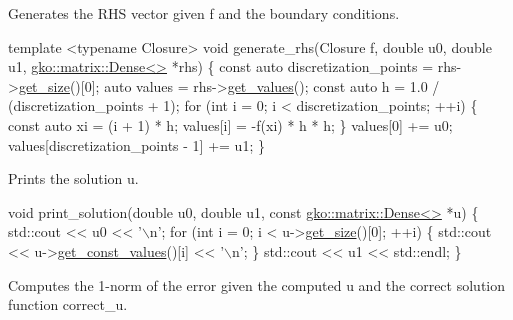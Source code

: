 Generates the R\+HS vector given {\ttfamily f} and the boundary conditions.


\begin{DoxyCode}
\textcolor{keyword}{template} <\textcolor{keyword}{typename} Closure>
\textcolor{keywordtype}{void} generate\_rhs(Closure f, \textcolor{keywordtype}{double} u0, \textcolor{keywordtype}{double} u1, \hyperlink{classgko_1_1matrix_1_1Dense}{gko::matrix::Dense<>} *rhs)
\{
    \textcolor{keyword}{const} \textcolor{keyword}{auto} discretization\_points = rhs->\hyperlink{classgko_1_1LinOp_a31b3c003388eb0b95393154f68c2b98d}{get\_size}()[0];
    \textcolor{keyword}{auto} values = rhs->\hyperlink{classgko_1_1matrix_1_1Dense_a3bc458e02fab8e4c9f60f70bd4d5a4f9}{get\_values}();
    \textcolor{keyword}{const} \textcolor{keyword}{auto} h = 1.0 / (discretization\_points + 1);
    \textcolor{keywordflow}{for} (\textcolor{keywordtype}{int} i = 0; i < discretization\_points; ++i) \{
        \textcolor{keyword}{const} \textcolor{keyword}{auto} xi = (i + 1) * h;
        values[i] = -f(xi) * h * h;
    \}
    values[0] += u0;
    values[discretization\_points - 1] += u1;
\}
\end{DoxyCode}


Prints the solution {\ttfamily u}.


\begin{DoxyCode}
\textcolor{keywordtype}{void} print\_solution(\textcolor{keywordtype}{double} u0, \textcolor{keywordtype}{double} u1, \textcolor{keyword}{const} \hyperlink{classgko_1_1matrix_1_1Dense}{gko::matrix::Dense<>} *u)
\{
    std::cout << u0 << \textcolor{charliteral}{'\(\backslash\)n'};
    \textcolor{keywordflow}{for} (\textcolor{keywordtype}{int} i = 0; i < u->\hyperlink{classgko_1_1LinOp_a31b3c003388eb0b95393154f68c2b98d}{get\_size}()[0]; ++i) \{
        std::cout << u->\hyperlink{classgko_1_1matrix_1_1Dense_ab83c739c1b11abaecc3bfd89506f6c9c}{get\_const\_values}()[i] << \textcolor{charliteral}{'\(\backslash\)n'};
    \}
    std::cout << u1 << std::endl;
\}
\end{DoxyCode}


Computes the 1-\/norm of the error given the computed {\ttfamily u} and the correct solution function {\ttfamily correct\+\_\+u}.


